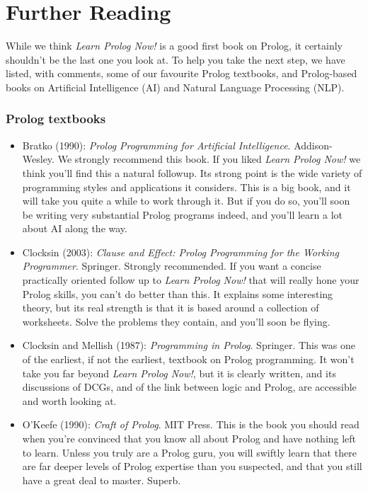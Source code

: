 
\chapter*{Further Reading}\label{Appendix:books}

While we think \textit{Learn Prolog Now!} is a good first book on Prolog, it
certainly shouldn't be the last one you look at. To help you take the next
step, we have listed, with comments, some of our favourite Prolog textbooks,
and Prolog-based books on Artificial Intelligence (AI) and Natural Language
Processing (NLP).


\subsection*{Prolog textbooks}

\begin{itemize}

\item Bratko (1990): \textit{Prolog Programming for Artificial
Intelligence}. Addison-Wesley.  We strongly recommend this book. If you liked
\textit{Learn Prolog Now!}  we think you'll find this a natural followup. Its
strong point is the wide variety of programming styles and applications it
considers.  This is a big book, and it will take you quite a while to work
through it. But if you do so, you'll soon be writing very substantial Prolog
programs indeed, and you'll learn a lot about AI along the way.

\item Clocksin (2003): \textit{Clause and Effect: Prolog Programming
for the Working Programmer}. Springer.  Strongly recommended. If you
want a concise practically oriented follow up to \textit{Learn Prolog
Now!}  that will really hone your Prolog skills, you can't do better
than this. It explains some interesting theory, but its real strength
is that it is based around a collection of worksheets. Solve the
problems they contain, and you'll soon be flying.

\item Clocksin and Mellish (1987): \textit{Programming in Prolog}. Springer.
  This was one of the earliest, if not the earliest, textbook on Prolog
  programming. It won't take you far beyond \textit{Learn Prolog Now!}, but it
  is clearly written, and its discussions of DCGs, and of the link between
  logic and Prolog, are accessible and worth looking at.


\item O'Keefe (1990): \textit{Craft of Prolog}. MIT Press.  This is the book
you should read when you're convinced that you know all about Prolog and have
nothing left to learn. Unless you truly are a Prolog guru, you will swiftly
learn that there are far deeper levels of Prolog expertise than you suspected,
and that you still have a great deal to master. Superb.


\end{itemize}
